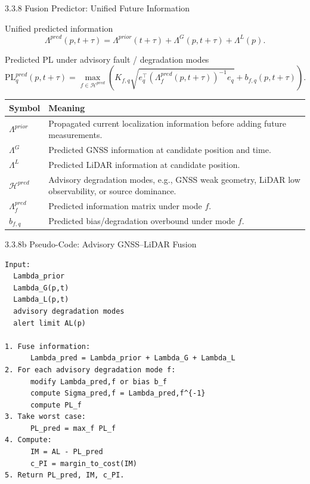 \documentclass[10pt,aspectratio=169,xcolor=dvipsnames]{beamer}
\newcommand{\PL}{\mathrm{PL}}
\newcommand{\Hset}{\mathcal{H}}
\begin{document}
\begin{frame}{3.3.8 Fusion Predictor: Unified Future Information}
  \small
  \begin{block}{Unified predicted information}
    \[
      \Lambda^{pred}(p,t+\tau)=\Lambda^{prior}(t+\tau)+\Lambda^G(p,t+\tau)+\Lambda^L(p).
    \]
  \end{block}

  \begin{block}{Predicted PL under advisory fault / degradation modes}
    \[
      \PL^{pred}_q(p,t+\tau)=
      \max_{f\in\Hset^{pred}}
      \left(
        K_{f,q}\sqrt{e_q^\top\left(\Lambda^{pred}_f(p,t+\tau)\right)^{-1}e_q}
        +b_{f,q}(p,t+\tau)
      \right).
    \]
  \end{block}

  \begin{table}\scriptsize
    \begin{tabular}{p{} p{}}
      \toprule
      \textbf{Symbol} & \textbf{Meaning}\\
      \midrule
      $\Lambda^{prior}$ & Propagated current localization information before adding future measurements.\\
      $\Lambda^G$ & Predicted GNSS information at candidate position and time.\\
      $\Lambda^L$ & Predicted LiDAR information at candidate position.\\
      $\Hset^{pred}$ & Advisory degradation modes, e.g., GNSS weak geometry, LiDAR low observability, or source dominance.\\
      $\Lambda^{pred}_f$ & Predicted information matrix under mode $f$.\\
      $b_{f,q}$ & Predicted bias/degradation overbound under mode $f$.\\
      \bottomrule
    \end{tabular}
  \end{table}
\end{frame}

\begin{frame}[fragile]{3.3.8b Pseudo-Code: Advisory GNSS--LiDAR Fusion}
\begin{lstlisting}
Input:
  Lambda_prior
  Lambda_G(p,t)
  Lambda_L(p,t)
  advisory degradation modes
  alert limit AL(p)

1. Fuse information:
      Lambda_pred = Lambda_prior + Lambda_G + Lambda_L
2. For each advisory degradation mode f:
      modify Lambda_pred,f or bias b_f
      compute Sigma_pred,f = Lambda_pred,f^{-1}
      compute PL_f
3. Take worst case:
      PL_pred = max_f PL_f
4. Compute:
      IM = AL - PL_pred
      c_PI = margin_to_cost(IM)
5. Return PL_pred, IM, c_PI.
\end{lstlisting}
\end{frame}
\end{document}
